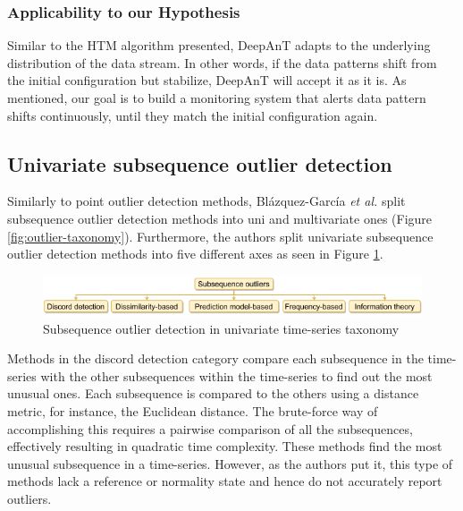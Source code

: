 \subsubsection*{Applicability to our Hypothesis}
Similar to the HTM algorithm presented, DeepAnT adapts to the underlying distribution of the data stream. In other words, if the data patterns shift from the initial configuration but stabilize, DeepAnT will accept it as it is. As mentioned, our goal is to build a monitoring system that alerts data pattern shifts continuously, until they match the initial configuration again.

\subsection{Univariate subsequence outlier detection} \label{sec:uni-sub-out}
Similarly to point outlier detection methods, Blázquez-García \emph{et al.} \cite{Blazquez-Garcia-Review-Anomaly-Detection} split subsequence outlier detection methods into uni and multivariate ones (Figure \ref{fig:outlier-taxonomy}). Furthermore, the authors split univariate subsequence outlier detection methods into five different axes as seen in Figure \ref{fig:subsequence-outlier-taxonomy}.

\begin{figure}[!htb]
  \begin{center}
    \includegraphics[scale=0.8]{figures/taxonomy-subsequence-outlier-uni.png}
    \caption{Subsequence outlier detection in univariate time-series taxonomy}
    \label{fig:subsequence-outlier-taxonomy}
  \end{center}
\end{figure}

Methods in the discord detection category compare each subsequence in the time-series with the other subsequences within the time-series to find out the most unusual ones. Each subsequence is compared to the others using a distance metric, for instance, the Euclidean distance. The brute-force way of accomplishing this requires a pairwise comparison of all the subsequences, effectively resulting in quadratic time complexity. These methods find the most unusual subsequence in a time-series. However, as the authors put it, this type of methods lack a reference or normality state and hence do not accurately report outliers.

